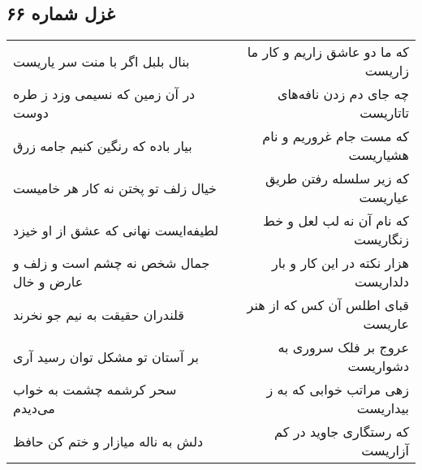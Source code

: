 \begin{center}
\section*{غزل شماره ۶۶}
\label{sec:sh066}
\begin{longtable}{l p{0.5cm} r}
بنال بلبل اگر با منت سر یاریست
&&
که ما دو عاشق زاریم و کار ما زاریست
\\
در آن زمین که نسیمی وزد ز طره دوست
&&
چه جای دم زدن نافه‌های تاتاریست
\\
بیار باده که رنگین کنیم جامه زرق
&&
که مست جام غروریم و نام هشیاریست
\\
خیال زلف تو پختن نه کار هر خامیست
&&
که زیر سلسله رفتن طریق عیاریست
\\
لطیفه‌ایست نهانی که عشق از او خیزد
&&
که نام آن نه لب لعل و خط زنگاریست
\\
جمال شخص نه چشم است و زلف و عارض و خال
&&
هزار نکته در این کار و بار دلداریست
\\
قلندران حقیقت به نیم جو نخرند
&&
قبای اطلس آن کس که از هنر عاریست
\\
بر آستان تو مشکل توان رسید آری
&&
عروج بر فلک سروری به دشواریست
\\
سحر کرشمه چشمت به خواب می‌دیدم
&&
زهی مراتب خوابی که به ز بیداریست
\\
دلش به ناله میازار و ختم کن حافظ
&&
که رستگاری جاوید در کم آزاریست
\\
\end{longtable}
\end{center}
